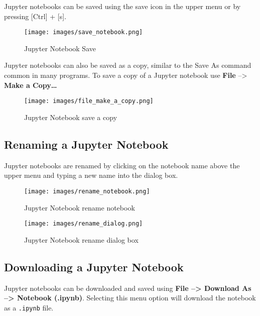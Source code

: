 \documentclass{book}
\makeatletter
\def\maxwidth{\ifdim\Gin@nat@width>\linewidth\linewidth
\else\Gin@nat@width\fi}
\let\Oldincludegraphics\includegraphics
\renewcommand{\includegraphics}[1]{\Oldincludegraphics[width=.8\maxwidth]{#1}}
\newcommand{\passthrough}[1]{#1}
\makeatother
\begin{document}
Jupyter notebooks can be saved using the save icon in the upper menu or
by pressing {[}Ctrl{]} + {[}s{]}.

\begin{figure}
\centering
\texttt{[image: images/save\_notebook.png]}
\caption{Jupyter Notebook Save}
\end{figure}

Jupyter notebooks can also be saved as a copy, similar to the Save As
command common in many programs. To save a copy of a Jupyter notebook
use \textbf{File} --\textgreater{} \textbf{Make a Copy\ldots{}}

\begin{figure}
\centering
\texttt{[image: images/file\_make\_a\_copy.png]}
\caption{Jupyter Notebook save a copy}
\end{figure}
    




    
        \hypertarget{renaming-a-jupyter-notebook}{%
\subsection{Renaming a Jupyter
Notebook}\label{renaming-a-jupyter-notebook}}

Jupyter notebooks are renamed by clicking on the notebook name above the
upper menu and typing a new name into the dialog box.

\begin{figure}
\centering
\texttt{[image: images/rename\_notebook.png]}
\caption{Jupyter Notebook rename notebook}
\end{figure}

\begin{figure}
\centering
\texttt{[image: images/rename\_dialog.png]}
\caption{Jupyter Notebook rename dialog box}
\end{figure}
    




    
        \hypertarget{downloading-a-jupyter-notebook}{%
\subsection{Downloading a Jupyter
Notebook}\label{downloading-a-jupyter-notebook}}

Jupyter notebooks can be downloaded and saved using \textbf{File
--\textgreater{} Download As --\textgreater{} Notebook (.ipynb)}.
Selecting this menu option will download the notebook as a
\passthrough{\lstinline!.ipynb!} file.
\end{document}
